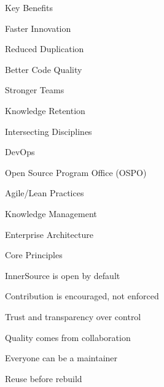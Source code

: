 \documentclass[final]{beamer}
\begin{document}
\begin{frame}[t]
\begin{columns}[T]
\begin{column}{.25\textwidth}
\begin{innersourcesection}{\keybenefitsicon}{Key Benefits}
    \item Faster Innovation
    \item Reduced Duplication
    \item Better Code Quality
    \item Stronger Teams
    \item Knowledge Retention
\end{innersourcesection}

\begin{innersourcesection}{\disciplinesicon}{Intersecting Disciplines}
    \item DevOps
    \item Open Source Program Office (OSPO)
    \item Agile/Lean Practices
    \item Knowledge Management
    \item Enterprise Architecture
\end{innersourcesection}

\begin{innersourcesection}{\principlesicon}{Core Principles}
    \item InnerSource is open by default
    \item Contribution is encouraged, not enforced
    \item Trust and transparency over control
    \item Quality comes from collaboration
    \item Everyone can be a maintainer
    \item Reuse before rebuild
\end{innersourcesection}
\end{column}
\begin{column}{.1\textwidth}
\end{column}
\end{columns}

\end{frame}
\end{document}
